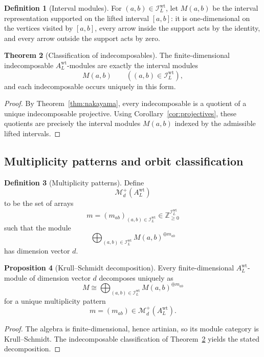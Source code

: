 \documentclass[11pt]{article}
\newcommand{\Z}{\mathbb{Z}}
\theoremstyle{definition}
\newtheorem{theorem}{Theorem}[section]
\newtheorem{proposition}[theorem]{Proposition}
\newtheorem{definition}[theorem]{Definition}
\begin{document}
\begin{definition}[Interval modules]
For \((a,b)\in \mathcal I_L^{\mathrm{wt}}\), let \(M(a,b)\) be the interval
representation supported on the lifted interval \([a,b]\): it is one-dimensional
on the vertices visited by \([a,b]\), every arrow inside the support acts by the
identity, and every arrow outside the support acts by zero.
\end{definition}

\begin{theorem}[Classification of indecomposables]
\label{thm:indecomp}
The finite-dimensional indecomposable \(A_L^{\mathrm{wt}}\)-modules are exactly
the interval modules
\[
M(a,b)
\qquad
((a,b)\in \mathcal I_L^{\mathrm{wt}}),
\]
and each indecomposable occurs uniquely in this form.
\end{theorem}

\begin{proof}
By Theorem~\ref{thm:nakayama}, every indecomposable is a quotient of a unique
indecomposable projective. Using Corollary~\ref{cor:projectives}, these
quotients are precisely the interval modules \(M(a,b)\) indexed by the admissible
lifted intervals.
\end{proof}

\subsection{Multiplicity patterns and orbit classification}

\begin{definition}[Multiplicity patterns]
Define
\[
\mathcal M_d^+(A_L^{\mathrm{wt}})
\]
to be the set of arrays
\[
m=(m_{ab})_{(a,b)\in \mathcal I_L^{\mathrm{wt}}}\in
\Z_{\geq 0}^{\mathcal I_L^{\mathrm{wt}}}
\]
such that the module
\[
\bigoplus_{(a,b)\in \mathcal I_L^{\mathrm{wt}}} M(a,b)^{\oplus m_{ab}}
\]
has dimension vector \(d\).
\end{definition}

\begin{proposition}[Krull--Schmidt decomposition]
\label{prop:krull-schmidt}
Every finite-dimensional \(A_L^{\mathrm{wt}}\)-module of dimension vector \(d\)
decomposes uniquely as
\[
M\cong \bigoplus_{(a,b)\in \mathcal I_L^{\mathrm{wt}}}
M(a,b)^{\oplus m_{ab}}
\]
for a unique multiplicity pattern
\[
m=(m_{ab})\in \mathcal M_d^+(A_L^{\mathrm{wt}}).
\]
\end{proposition}

\begin{proof}
The algebra is finite-dimensional, hence artinian, so its module category is
Krull--Schmidt. The indecomposable classification of
Theorem~\ref{thm:indecomp} yields the stated decomposition.
\end{proof}
\end{document}
